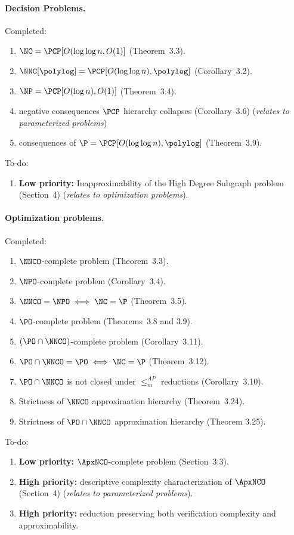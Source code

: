 \documentclass[draft]{article}
\begin{document}
\paragraph{Decision Problems.}
Completed:
\begin{enumerate}
\item $\NC = \PCP[O(\log \log n, O(1)]$ (Theorem~3.3).
\item $\NNC[\polylog] = \PCP[O(\log \log n), \polylog]$ (Corollary~3.2).
\item $\NP = \PCP[O(\log n), O(1)]$ (Theorem~3.4).
\item negative consequences $\PCP$ hierarchy collapses (Corollary~3.6) (\emph{relates to parameterized problems})
\item consequences of $\P = \PCP[O(\log \log n), \polylog]$ (Theorem~3.9).
\end{enumerate}
To-do:
\begin{enumerate}
\item \textbf{Low priority:} Inapproximability of the High Degree Subgraph problem (Section~4) (\emph{relates to optimization problems}).
\end{enumerate}

\paragraph{Optimization problems.}

Completed:
\begin{enumerate}
\item $\NNCO$-complete problem (Theorem~3.3).
\item $\NPO$-complete problem (Corollary~3.4).
\item $\NNCO = \NPO \iff \NC = \P$ (Theorem~3.5).

\item $\PO$-complete problem (Theorems~3.8 and 3.9).
\item $(\PO \cap \NNCO)$-complete problem (Corollary~3.11).
\item $\PO \cap \NNCO = \PO \iff \NC = \P$ (Theorem~3.12).

\item $\PO \cap \NNCO$ is not closed under $\leq_m^{AP}$ reductions (Corollary~3.10).

\item Strictness of $\NNCO$ approximation hierarchy (Theorem~3.24).
\item Strictness of $\PO \cap \NNCO$ approximation hierarchy (Theorem 3.25).
\end{enumerate}
To-do:
\begin{enumerate}
\item \textbf{Low priority:} $\ApxNCO$-complete problem (Section~3.3).
\item \textbf{High priority:} descriptive complexity characterization of $\ApxNCO$ (Section~4) (\emph{relates to parameterized problems}).
\item \textbf{High priority:} reduction preserving both verification complexity and approximability.
\end{enumerate}
\end{document}
